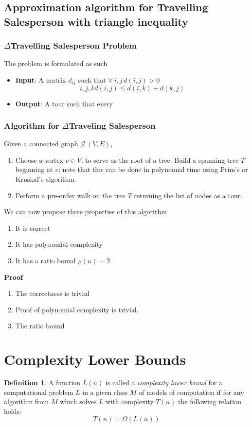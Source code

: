 \documentclass{article}
\theoremstyle{definition}
\newtheorem{definition}{Definition}[section]
\begin{document}
\subsection{Approximation algorithm for Travelling Salesperson with triangle inequality}
\subsubsection{$\Delta$Travelling Salesperson Problem}
The problem is formulated as such
\begin{itemize}
    \item \textbf{Input}:
        A matrix $d_{ij}$ such that $\forall\ i,j\, d(i,j) > 0$
        $$
        i,j,k d(i,j) \leq d(i,k) + d(k,j)
        $$
    \item \textbf{Output}:
        A tour such that every 
\end{itemize}

\subsubsection{Algorithm for $\Delta$Traveling Salesperson}
Given a connected graph $\mathcal{G}\ (V,E)$,
\begin{enumerate}
    \item
        Choose a vertex $v \in V$, to serve as the root of a tree.
        Build a spanning tree $T$ beginning at $v$;
        note that this can be done in polynomial time using Prim's or Kruskal's algorithm.
    \item
        Perform a pre-order walk on the tree $T$ returning the list of nodes as a tour.
\end{enumerate}

We can now propose three properties of this algorithm
\begin{enumerate}
    \item It is correct
    \item It has polynomial complexity
    \item It has a ratio bound $\rho(n) = 2$
\end{enumerate}
\textbf{Proof}
\begin{enumerate}
    \item
        The correctness is trivial
    \item
        Proof of polynomial complexity is trivial.
    \item
        The ratio bound
\end{enumerate}

\pagebreak
\section{Complexity Lower Bounds}
\begin{definition}
    A function $L(n)$ is called a \textit{complexity lower bound}
    for a computational problem $L$
    in a given class $M$ of models of computation
    if for any algorithm from $M$ which solves $L$ with complexity $T(n)$ the following relation holds:
    $$T(n) = \Omega(L(n))$$
\end{definition}
\end{document}
